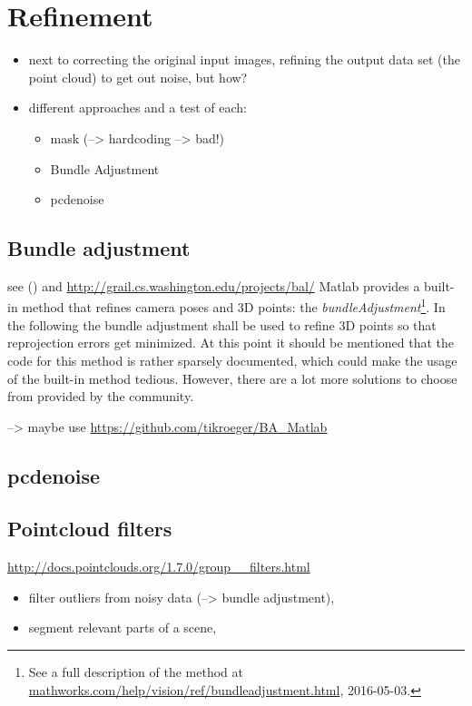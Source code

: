 \section{Refinement}\label{sec:refinement}

\begin{itemize}
\item next to correcting the original input images, refining the output data set (the point cloud) to get out noise, but how?
\item different approaches and a test of each:
  \begin{itemize}
   \item mask (--> hardcoding --> bad!)
   \item Bundle Adjustment
   \item pcdenoise
   \end{itemize}
\end{itemize}


\subsection{Bundle adjustment}
see (\cite[p.320]{Szeliski.2011})
and \url{http://grail.cs.washington.edu/projects/bal/}
Matlab provides a built-in method that refines camera poses and 3D points: the \textit{bundleAdjustment}\footnote{See a full description of the method at \url{mathworks.com/help/vision/ref/bundleadjustment.html}, 2016-05-03.}. In the following the bundle adjustment  shall be used to refine 3D points so that reprojection errors get minimized. At this point it should be mentioned that the code for this method is rather sparsely documented, which could make the usage of the built-in method tedious. However, there are a lot more solutions to choose from provided by the community.

--> maybe use \url{https://github.com/tikroeger/BA_Matlab}




\subsection{pcdenoise}

\subsection{Pointcloud filters}
\url{http://docs.pointclouds.org/1.7.0/group__filters.html}
\begin{itemize}
\item filter outliers from noisy data (--> bundle adjustment), 
\item segment relevant parts of a scene, 
\end{itemize}

